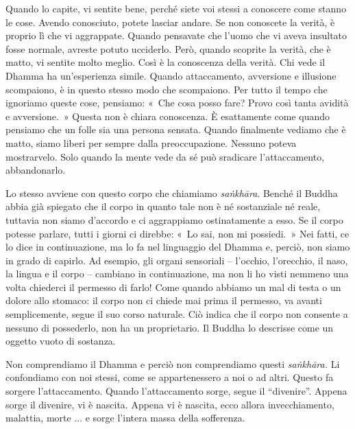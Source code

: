 Quando lo capite, vi sentite bene, perché siete voi stessi a conoscere
come stanno le cose. Avendo conosciuto, potete lasciar andare. Se non
conoscete la verità, è proprio lì che vi aggrappate. Quando pensavate
che l'uomo che vi aveva insultato fosse normale, avreste potuto
ucciderlo. Però, quando scoprite la verità, che è matto, vi sentite
molto meglio. Così è la conoscenza della verità. Chi vede il Dhamma ha
un'esperienza simile. Quando attaccamento, avversione e illusione
scompaiono, è in questo stesso modo che scompaiono. Per tutto il tempo
che ignoriamo queste cose, pensiamo: «~Che cosa posso fare? Provo così
tanta avidità e avversione.~» Questa non è chiara conoscenza. È
esattamente come quando pensiamo che un folle sia una persona sensata.
Quando finalmente vediamo che è matto, siamo liberi per sempre dalla
preoccupazione. Nessuno poteva mostrarvelo. Solo quando la mente vede da
sé può sradicare l'attaccamento, abbandonarlo.

Lo stesso avviene con questo corpo che chiamiamo \emph{saṅkhāra}. Benché
il Buddha abbia già spiegato che il corpo in quanto tale non è né
sostanziale né reale, tuttavia non siamo d'accordo e ci aggrappiamo
ostinatamente a esso. Se il corpo potesse parlare, tutti i giorni ci
direbbe: «~Lo sai, non mi possiedi.~» Nei fatti, ce lo dice in
continuazione, ma lo fa nel linguaggio del Dhamma e, perciò, non siamo
in grado di capirlo. Ad esempio, gli organi sensoriali -- l'occhio,
l'orecchio, il naso, la lingua e il corpo -- cambiano in continuazione,
ma non li ho visti nemmeno una volta chiederci il permesso di farlo!
Come quando abbiamo un mal di testa o un dolore allo stomaco: il corpo
non ci chiede mai prima il permesso, va avanti semplicemente, segue il
suo corso naturale. Ciò indica che il corpo non consente a nessuno di
possederlo, non ha un proprietario. Il Buddha lo descrisse come un
oggetto vuoto di sostanza.

Non comprendiamo il Dhamma e perciò non comprendiamo questi
\emph{saṅkhāra.} Li confondiamo con noi stessi, come se appartenessero a
noi o ad altri. Questo fa sorgere l'attaccamento. Quando l'attaccamento
sorge, segue il ``divenire''. Appena sorge il divenire, vi è nascita.
Appena vi è nascita, ecco allora invecchiamento, malattia, morte ... e
sorge l'intera massa della sofferenza.

